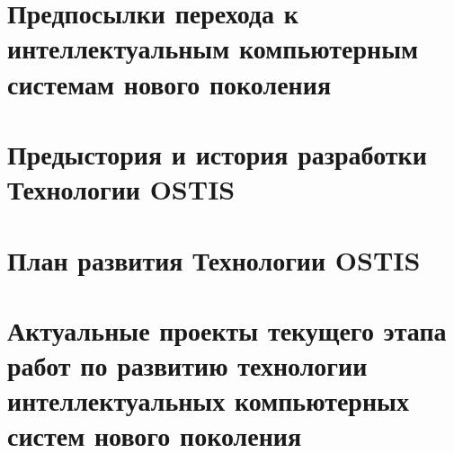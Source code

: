 \section*{Предпосылки перехода к интеллектуальным компьютерным системам нового поколения}
\label{concl_transition_background}

\section*{Предыстория и история разработки Технологии OSTIS}
\label{concl_ostis_history}

\section*{План развития Технологии OSTIS}
\label{concl_ostis_plan}

\section*{Актуальные проекты текущего этапа работ по развитию технологии интеллектуальных компьютерных систем нового поколения}
\label{concl_actual_projects_current_stage_work_development_technology}

